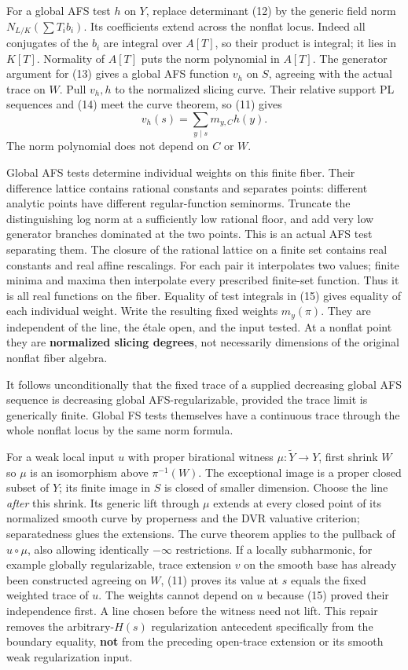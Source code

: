 \documentclass[
  11pt,
]{article}
\begin{document}
For a global AFS test \(h\) on \(Y\), replace determinant (12) by the
generic field norm \(N_{L/K}(\sum T_i b_i)\). Its coefficients extend
across the nonflat locus. Indeed all conjugates of the \(b_i\) are
integral over \(A[T]\), so their product is integral; it lies in
\(K[T]\). Normality of \(A[T]\) puts the norm polynomial in \(A[T]\).
The generator argument for (13) gives a global AFS function \(v_h\) on
\(S\), agreeing with the actual trace on \(W\). Pull \(v_h,h\) to the
normalized slicing curve. Their relative support PL sequences and (14)
meet the curve theorem, so (11) gives
\[v_h(s)=\sum_{y\mid s}m_{y,C}h(y).                                    \tag{15}\]
The norm polynomial does not depend on \(C\) or \(W\).

Global AFS tests determine individual weights on this finite fiber.
Their difference lattice contains rational constants and separates
points: different analytic points have different regular-function
seminorms. Truncate the distinguishing log norm at a sufficiently low
rational floor, and add very low generator branches dominated at the two
points. This is an actual AFS test separating them. The closure of the
rational lattice on a finite set contains real constants and real affine
rescalings. For each pair it interpolates two values; finite minima and
maxima then interpolate every prescribed finite-set function. Thus it is
all real functions on the fiber. Equality of test integrals in (15)
gives equality of each individual weight. Write the resulting fixed
weights \(m_y(\pi)\). They are independent of the line, the étale open,
and the input tested. At a nonflat point they are \textbf{normalized
slicing degrees}, not necessarily dimensions of the original nonflat
fiber algebra.

It follows unconditionally that the fixed trace of a supplied decreasing
global AFS sequence is decreasing global AFS-regularizable, provided the
trace limit is generically finite. Global FS tests themselves have a
continuous trace through the whole nonflat locus by the same norm
formula.

For a weak local input \(u\) with proper birational witness
\(\mu:\widetilde Y\to Y\), first shrink \(W\) so \(\mu\) is an
isomorphism above \(\pi^{-1}(W)\). The exceptional image is a proper
closed subset of \(Y\); its finite image in \(S\) is closed of smaller
dimension. Choose the line \emph{after} this shrink. Its generic lift
through \(\mu\) extends at every closed point of its normalized smooth
curve by properness and the DVR valuative criterion; separatedness glues
the extensions. The curve theorem applies to the pullback of
\(u\circ\mu\), also allowing identically \(-\infty\) restrictions. If a
locally subharmonic, for example globally regularizable, trace extension
\(v\) on the smooth base has already been constructed agreeing on \(W\),
(11) proves its value at \(s\) equals the fixed weighted trace of \(u\).
The weights cannot depend on \(u\) because (15) proved their
independence first. A line chosen before the witness need not lift. This
repair removes the arbitrary-\(H(s)\) regularization antecedent
specifically from the boundary equality, \textbf{not} from the preceding
open-trace extension or its smooth weak regularization input.
\end{document}
